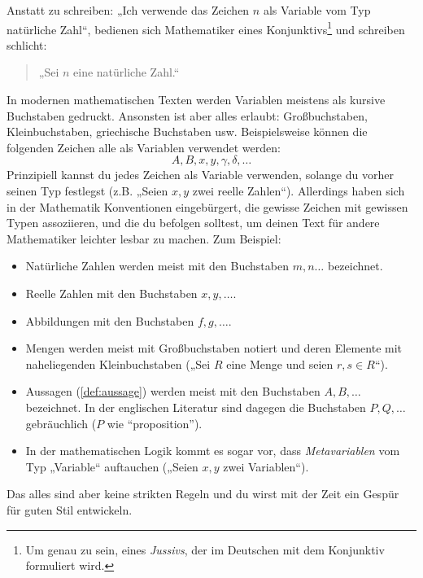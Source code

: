 \begin{nota}
    Anstatt zu schreiben: „Ich verwende das Zeichen $n$ als Variable vom Typ natürliche Zahl“, bedienen sich Mathematiker eines Konjunktivs\footnote{Um genau zu sein, eines \emph{Jussivs}, der im Deutschen mit dem Konjunktiv formuliert wird.} und schreiben schlicht:
    \begin{quote}
        „Sei $n$ eine natürliche Zahl.“
    \end{quote}
    In modernen mathematischen Texten werden Variablen meistens als kursive Buchstaben gedruckt. Ansonsten ist aber alles erlaubt: Großbuchstaben, Kleinbuchstaben, griechische Buchstaben usw. Beispielsweise können die folgenden Zeichen alle als Variablen verwendet werden:
        \[ A,B,x,y,\gamma,\delta,\dots \]
    Prinzipiell kannst du jedes Zeichen als Variable verwenden, solange du vorher seinen Typ festlegst (z.B. „Seien $x,y$ zwei reelle Zahlen“). Allerdings haben sich in der Mathematik Konventionen eingebürgert, die gewisse Zeichen mit gewissen Typen assoziieren, und die du befolgen solltest, um deinen Text für andere Mathematiker leichter lesbar zu machen. Zum Beispiel:
    \begin{itemize}
        \item Natürliche Zahlen werden meist mit den Buchstaben $m,n\dots$ bezeichnet.
        \item Reelle Zahlen mit den Buchstaben $x,y,\dots$.
        \item Abbildungen mit den Buchstaben $f,g,\dots$.
        \item Mengen werden meist mit Großbuchstaben notiert und deren Elemente mit naheliegenden Kleinbuchstaben („Sei $R$ eine Menge und seien $r,s\in R$“).
        \item Aussagen (\cref{def:aussage}) werden meist mit den Buchstaben $A,B,\dots$ bezeichnet. In der englischen Literatur sind dagegen die Buchstaben $P,Q,\dots$ gebräuchlich ($P$ wie ``proposition'').
        \item In der mathematischen Logik kommt es sogar vor, dass \emph{Metavariablen} vom Typ „Variable“ auftauchen („Seien $x,y$ zwei Variablen“).
    \end{itemize}
    Das alles sind aber keine strikten Regeln und du wirst mit der Zeit ein Gespür für guten Stil entwickeln.
\end{nota}



